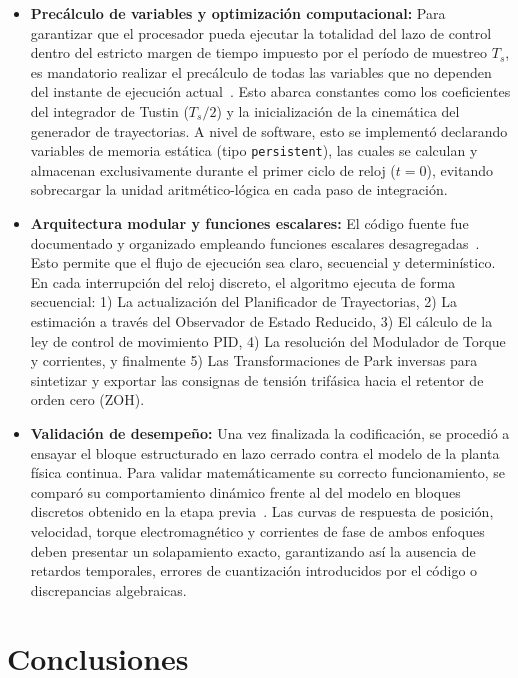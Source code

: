 \documentclass[12pt, a4paper,journal, onecolumn, compsoc]{IEEEtran}
\begin{document}
\begin{itemize}
    \item \textbf{Precálculo de variables y optimización computacional:} Para garantizar que el procesador pueda ejecutar la totalidad del lazo de control dentro del estricto margen de tiempo impuesto por el período de muestreo $T_s$, es mandatorio realizar el precálculo de todas las variables que no dependen del instante de ejecución actual~\cite{guia_trabajo}. Esto abarca constantes como los coeficientes del integrador de Tustin ($T_s/2$) y la inicialización de la cinemática del generador de trayectorias. A nivel de software, esto se implementó declarando variables de memoria estática (tipo \texttt{persistent}), las cuales se calculan y almacenan exclusivamente durante el primer ciclo de reloj ($t=0$), evitando sobrecargar la unidad aritmético-lógica en cada paso de integración.
    \item \textbf{Arquitectura modular y funciones escalares:} El código fuente fue documentado y organizado empleando funciones escalares desagregadas~\cite{guia_trabajo}. Esto permite que el flujo de ejecución sea claro, secuencial y determinístico. En cada interrupción del reloj discreto, el algoritmo ejecuta de forma secuencial: 1) La actualización del Planificador de Trayectorias, 2) La estimación a través del Observador de Estado Reducido, 3) El cálculo de la ley de control de movimiento PID, 4) La resolución del Modulador de Torque y corrientes, y finalmente 5) Las Transformaciones de Park inversas para sintetizar y exportar las consignas de tensión trifásica hacia el retentor de orden cero (ZOH).
    \item \textbf{Validación de desempeño:} Una vez finalizada la codificación, se procedió a ensayar el bloque estructurado en lazo cerrado contra el modelo de la planta física continua. Para validar matemáticamente su correcto funcionamiento, se comparó su comportamiento dinámico frente al del modelo en bloques discretos obtenido en la etapa previa~\cite{guia_trabajo}. Las curvas de respuesta de posición, velocidad, torque electromagnético y corrientes de fase de ambos enfoques deben presentar un solapamiento exacto, garantizando así la ausencia de retardos temporales, errores de cuantización introducidos por el código o discrepancias algebraicas.
\end{itemize}

\section{Conclusiones}
\end{document}
